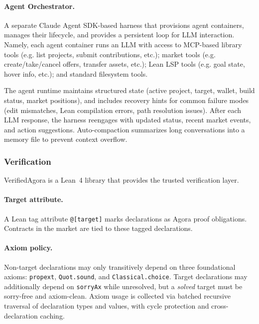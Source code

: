 \paragraph{Agent Orchestrator.}
A separate Claude Agent SDK-based harness that provisions agent containers, manages their lifecycle, and provides a persistent loop for LLM interaction. Namely, each agent container runs an LLM with access to MCP-based library tools (e.g. list projects, submit contributions, etc.); market tools (e.g. create/take/cancel offers, transfer assets, etc.); Lean LSP tools (e.g. goal state, hover info, etc.); and standard filesystem tools.

The agent runtime maintains structured state (active project, target, wallet, build status, market positions), and includes recovery hints for common failure modes (edit mismatches, Lean compilation errors, path resolution issues). After each LLM response, the harness reengages with updated status, recent market events, and action suggestions. Auto-compaction summarizes long conversations into a memory file to prevent context overflow.


\subsubsection{Verification}\label{sec:verified-agora}

VerifiedAgora is a Lean~4 library that provides the trusted verification layer.

\paragraph{Target attribute.}
A Lean tag attribute \texttt{@[target]} marks declarations as Agora proof obligations. Contracts in the market are tied to these tagged declarations.

\paragraph{Axiom policy.}
Non-target declarations may only transitively depend on three foundational axioms: \texttt{propext}, \texttt{Quot.sound}, and \texttt{Classical.choice}. Target declarations may additionally depend on \texttt{sorryAx} while unresolved, but a \emph{solved} target must be sorry-free and axiom-clean. Axiom usage is collected via batched recursive traversal of declaration types and values, with cycle protection and cross-declaration caching.

